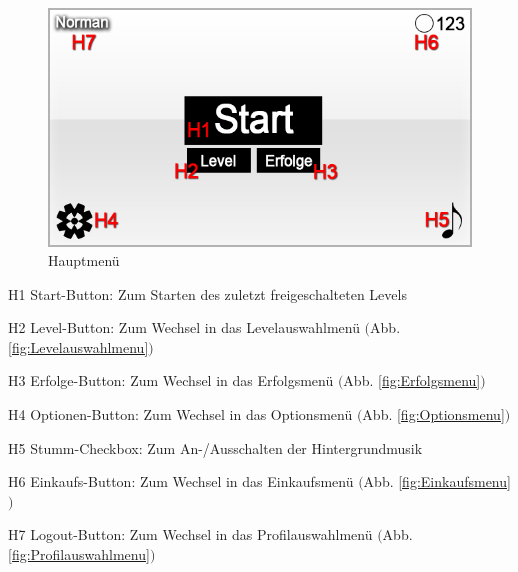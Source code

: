 
\begin{figure}[H]
\centering
\includegraphics[scale=0.55]{../gui/_jpeg_numeration/main_manu.jpg}
\caption{Hauptmenü}
\label{fig:Hauptmenu}
\end{figure}
\begin{description*}
\item[H1] Start-Button: Zum Starten des zuletzt freigeschalteten Levels
\item[H2] Level-Button: Zum Wechsel in das Levelauswahlmenü $($Abb. \ref{fig:Levelauswahlmenu}$)$
\item[H3] Erfolge-Button: Zum Wechsel in das Erfolgsmenü $($Abb. \ref{fig:Erfolgsmenu}$)$
\item[H4] Optionen-Button: Zum Wechsel in das Optionsmenü $($Abb. \ref{fig:Optionsmenu}$)$
\item[H5] Stumm-Checkbox: Zum An-/Ausschalten der Hintergrundmusik
\item[H6] Einkaufs-Button: Zum Wechsel in das Einkaufsmenü $($Abb. \ref{fig:Einkaufsmenu}$)$
\item[H7] Logout-Button: Zum Wechsel in das Profilauswahlmenü $($Abb. \ref{fig:Profilauswahlmenu}$)$
\end{description*}


